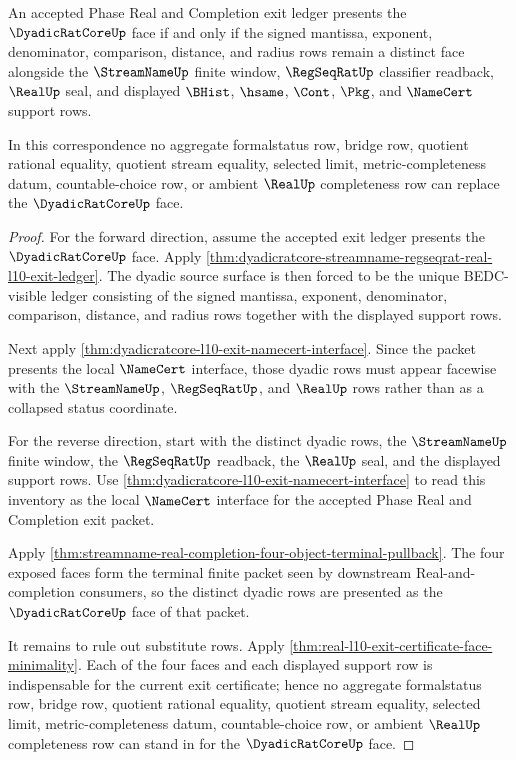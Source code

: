 \begin{theorem}
\label{thm:dyadicratcore-l10-exit-ledger-facewise-noncollapse}
An accepted Phase Real and Completion exit ledger presents the $\DyadicRatCoreUp$ face if and only if the signed mantissa, exponent, denominator, comparison, distance, and radius rows remain a distinct face alongside the $\StreamNameUp$ finite window, $\RegSeqRatUp$ classifier readback, $\RealUp$ seal, and displayed $\BHist$, $\hsame$, $\Cont$, $\Pkg$, and $\NameCert$ support rows.

In this correspondence no aggregate formalstatus row, bridge row, quotient rational equality, quotient stream equality, selected limit, metric-completeness datum, countable-choice row, or ambient $\RealUp$ completeness row can replace the $\DyadicRatCoreUp$ face.
\end{theorem}
\begin{proof}
For the forward direction, assume the accepted exit ledger presents the $\DyadicRatCoreUp$ face. Apply \autoref{thm:dyadicratcore-streamname-regseqrat-real-l10-exit-ledger}. The dyadic source surface is then forced to be the unique BEDC-visible ledger consisting of the signed mantissa, exponent, denominator, comparison, distance, and radius rows together with the displayed support rows.

Next apply \autoref{thm:dyadicratcore-l10-exit-namecert-interface}. Since the packet presents the local $\NameCert$ interface, those dyadic rows must appear facewise with the $\StreamNameUp$, $\RegSeqRatUp$, and $\RealUp$ rows rather than as a collapsed status coordinate.

For the reverse direction, start with the distinct dyadic rows, the $\StreamNameUp$ finite window, the $\RegSeqRatUp$ readback, the $\RealUp$ seal, and the displayed support rows. Use \autoref{thm:dyadicratcore-l10-exit-namecert-interface} to read this inventory as the local $\NameCert$ interface for the accepted Phase Real and Completion exit packet.

Apply \autoref{thm:streamname-real-completion-four-object-terminal-pullback}. The four exposed faces form the terminal finite packet seen by downstream Real-and-completion consumers, so the distinct dyadic rows are presented as the $\DyadicRatCoreUp$ face of that packet.

It remains to rule out substitute rows. Apply \autoref{thm:real-l10-exit-certificate-face-minimality}. Each of the four faces and each displayed support row is indispensable for the current exit certificate; hence no aggregate formalstatus row, bridge row, quotient rational equality, quotient stream equality, selected limit, metric-completeness datum, countable-choice row, or ambient $\RealUp$ completeness row can stand in for the $\DyadicRatCoreUp$ face.
\end{proof}

